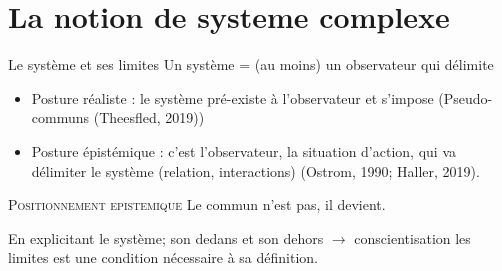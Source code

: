 \documentclass[newPxFont]{beamer}
\begin{document}

\section{La notion de systeme complexe}

\begin{frame}[c]{Le système et ses limites}
\vspace{-1cm}
Un système = (au moins) un observateur qui délimite
\begin{itemize}
  \item Posture réaliste : le système pré-existe à l'observateur et s'impose (Pseudo-communs (Theesfled, 2019))
  \item Posture épistémique : c'est l'observateur, la situation d'action, qui va délimiter le système (relation, interactions) (Ostrom, 1990; Haller, 2019).
\end{itemize}

\small{
  \begin{alertblock}{\textsc{Positionnement epistemique}}
      Le commun n'est pas, il devient.
  \end{alertblock}
}

En explicitant le système; son dedans et son dehors $\rightarrow$  conscientisation les limites est une condition nécessaire à sa définition.


\end{frame}
\end{document}

